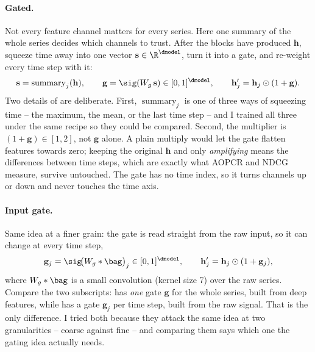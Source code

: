 \paragraph{Gated.}
Not every feature channel matters for every series. Here one summary of the whole series decides
which channels to trust. After the blocks have produced $\mathbf{h}$, squeeze time away into one
vector $\mathbf{s} \in \R^{\dmodel}$, turn it into a gate, and re-weight every time step with it:
\begin{equation}
  \mathbf{s} = \operatorname{summary}_j(\mathbf{h}) ,
  \qquad
  \mathbf{g} = \sig(W_g\,\mathbf{s}) \in [0,1]^{\dmodel} ,
  \qquad
  \mathbf{h}'_j = \mathbf{h}_j \odot (1 + \mathbf{g}) .
  \label{eq:gate}
\end{equation}
Two details of  are deliberate. First, $\operatorname{summary}_j$ is one of three ways
of squeezing time -- the maximum, the mean, or the last time step -- and I trained all three under
the same recipe so they could be compared. Second, the multiplier is $(1 + \mathbf{g}) \in [1,2]$,
not $\mathbf{g}$ alone. A plain multiply would let the gate flatten features towards zero; keeping
the original $\mathbf{h}$ and only \emph{amplifying} means the differences between time steps, which
are exactly what AOPCR and NDCG measure, survive untouched. The gate has no time index, so it turns
channels up or down and never touches the time axis.

\paragraph{Input gate.}
Same idea at a finer grain: the gate is read straight from the raw input, so it can change at every
time step,
\begin{equation}
  \mathbf{g}_j = \sig\!\big(W_g \ast \bag\big)_j \in [0,1]^{\dmodel},
  \qquad
  \mathbf{h}'_j = \mathbf{h}_j \odot (1 + \mathbf{g}_j) ,
  \label{eq:input_gate}
\end{equation}
where $W_g \ast \bag$ is a small convolution (kernel size 7) over the raw series. Compare the two
subscripts:  has \emph{one} gate $\mathbf{g}$ for the whole series, built from deep
features, while  has a gate $\mathbf{g}_j$ per time step, built from the raw
signal. That is the only difference. I tried both because they attack the same idea at two
granularities -- coarse against fine -- and comparing them says which one the gating idea actually
needs.

